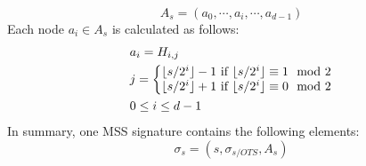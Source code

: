\begin{equation}
A_s = (a_0,\cdots, a_i, \cdots, a_{d-1})
\end{equation}
Each node $a_i \in A_s$ is calculated as follows:
\begin{align}
\label{eq:auth_path_calculation_merkle_tree}
&a_{i} = H_{i, j} \\
&j = 
\left\{\begin{matrix} \nonumber
\lfloor s/2^i\rfloor-1 \text{ if } \lfloor s/2^i\rfloor \equiv 1 \mod{2} \\
\lfloor s/2^i\rfloor+1 \text{ if } \lfloor s/2^i\rfloor \equiv 0 \mod{2}
\end{matrix}\right.  \nonumber \\
&0 \leq i \leq d-1 \nonumber
\end{align}
In summary, one MSS signature contains the following elements:
\begin{equation}
\label{eq:complete_merkle_signature_for_one_Ys}
\sigma_s = (s,\sigma_{s/OTS}, A_s) 
\end{equation}

